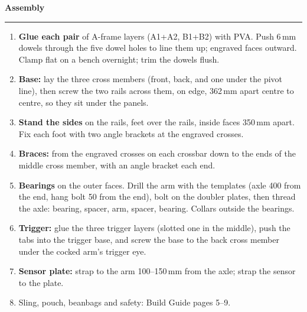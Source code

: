 \documentclass[11pt,a4paper]{article}
\newcommand{\sechead}[1]{%
  \par\vspace{5pt}%
  {\bfseries\large\color{HeadGrey} #1}\\[-4pt]
  {\color{RuleGrey}\rule{\linewidth}{0.8pt}}\par\vspace{1pt}}
\begin{document}
\begin{minipage}[t]{0.49\linewidth}
\sechead{Assembly}
\begin{enumerate}[itemsep=1pt, leftmargin=1.5em, topsep=1pt]
  \item \textbf{Glue each pair} of A-frame layers (A1+A2, B1+B2) with PVA. Push 6\,mm dowels through the five dowel holes to line them up; engraved faces outward. Clamp flat on a bench overnight; trim the dowels flush.
  \item \textbf{Base:} lay the three cross members (front, back, and one under the pivot line), then screw the two rails across them, on edge, 362\,mm apart centre to centre, so they sit under the panels.
  \item \textbf{Stand the sides} on the rails, feet over the rails, inside faces 350\,mm apart. Fix each foot with two angle brackets at the engraved crosses.
  \item \textbf{Braces:} from the engraved crosses on each crossbar down to the ends of the middle cross member, with an angle bracket each end.
  \item \textbf{Bearings} on the outer faces. Drill the arm with the templates (axle 400 from the end, hang bolt 50 from the end), bolt on the doubler plates, then thread the axle: bearing, spacer, arm, spacer, bearing. Collars outside the bearings.
  \item \textbf{Trigger:} glue the three trigger layers (slotted one in the middle), push the tabs into the trigger base, and screw the base to the back cross member under the cocked arm's trigger eye.
  \item \textbf{Sensor plate:} strap to the arm 100--150\,mm from the axle; strap the sensor to the plate.
  \item Sling, pouch, beanbags and safety: Build Guide pages 5--9.
\end{enumerate}
\end{minipage}\hfill
\end{document}
